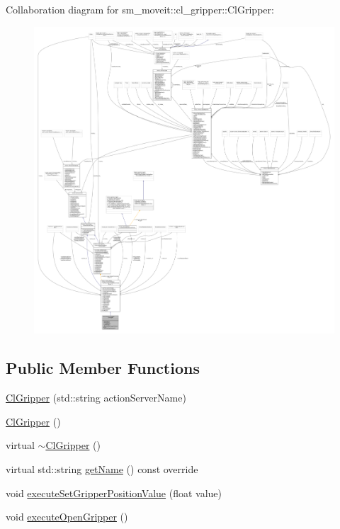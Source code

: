 Collaboration diagram for sm\+\_\+moveit\+:\+:cl\+\_\+gripper\+:\+:Cl\+Gripper\+:
\nopagebreak
\begin{figure}[H]
\begin{center}
\leavevmode
\includegraphics[width=350pt]{classsm__moveit_1_1cl__gripper_1_1ClGripper__coll__graph}
\end{center}
\end{figure}
\subsection*{Public Member Functions}
\begin{DoxyCompactItemize}
\item 
\hyperlink{classsm__moveit_1_1cl__gripper_1_1ClGripper_a4ef3c296cd9f60ea3067746537bb35f0}{Cl\+Gripper} (std\+::string action\+Server\+Name)
\item 
\hyperlink{classsm__moveit_1_1cl__gripper_1_1ClGripper_a80759a75cf2978da68fcbe1d9bfa187f}{Cl\+Gripper} ()
\item 
virtual \hyperlink{classsm__moveit_1_1cl__gripper_1_1ClGripper_aea940cc33f2f3b2ddef1c5e25c5a72bf}{$\sim$\+Cl\+Gripper} ()
\item 
virtual std\+::string \hyperlink{classsm__moveit_1_1cl__gripper_1_1ClGripper_a71ee172824d9eb24c9a386ea6d8822ea}{get\+Name} () const override
\item 
void \hyperlink{classsm__moveit_1_1cl__gripper_1_1ClGripper_a8e88fde18660c24285c97d97b372b44f}{execute\+Set\+Gripper\+Position\+Value} (float value)
\item 
void \hyperlink{classsm__moveit_1_1cl__gripper_1_1ClGripper_ad5ec34be67cb60a33ff48a104e0a51b2}{execute\+Open\+Gripper} ()
\end{DoxyCompactItemize}
